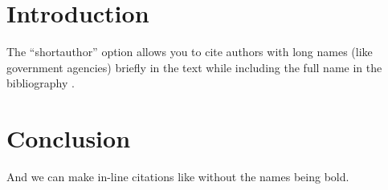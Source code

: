 \documentclass{article}
\begin{document}
\section{Introduction}
\begin{refsection}

The ``shortauthor'' option allows you to cite authors with long names (like
  government agencies) briefly in the text while including the full name in the
  bibliography \parencite{EPA99}.

\printbibliography

\end{refsection}

\section{Conclusion}
\begin{refsection}

And we can make in-line citations like \textcite{Tiebout56} without the names
  being bold.

\nocite{*}  %
\printbibliography

\end{refsection}
\end{document}
